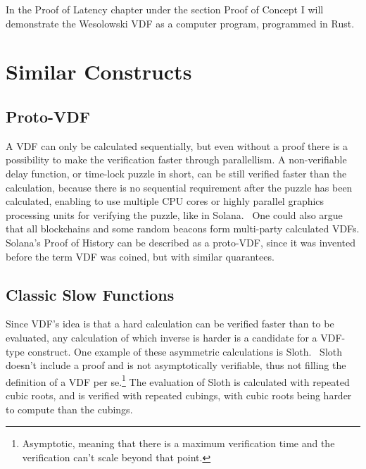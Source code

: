In the Proof of Latency chapter under the section Proof of Concept I will demonstrate the Wesolowski VDF as a computer program, programmed in Rust.


\section{Similar Constructs}
\subsection{Proto-VDF}
A VDF can only be calculated sequentially, but even without a proof there is a possibility to make the verification faster through parallellism. A non-verifiable delay function, or time-lock puzzle in short, can be still verified faster than the calculation, because there is no sequential requirement after the puzzle has been calculated, enabling to use multiple CPU cores or highly parallel graphics processing units for verifying the puzzle, like in Solana.~\cite{Yakovenko2018-zn} One could also argue that all blockchains and some random beacons form multi-party calculated VDFs. Solana's Proof of History can be described as a proto-VDF, since it was invented before the term VDF was coined, but with similar quarantees.

\subsection{Classic Slow Functions}
Since VDF's idea is that a hard calculation can be verified faster than to be evaluated, any calculation of which inverse is harder is a candidate for a VDF-type construct. One example of these asymmetric calculations is Sloth.~\cite{Boneh2018-sm} Sloth doesn't include a proof and is not asymptotically verifiable, thus not filling the definition of a VDF per se.\footnote{Asymptotic, meaning that there is a maximum verification time and the verification can't scale beyond that point.} The evaluation of Sloth is calculated with repeated cubic roots, and is verified with repeated cubings, with cubic roots being harder to compute than the cubings.

